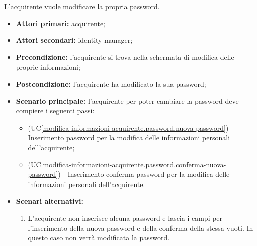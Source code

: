 \label{modifica-informazioni-acquirente.password}

L'acquirente vuole modificare la propria password.
\begin{itemize}
    \item \textbf{Attori primari:} acquirente;
    \item \textbf{Attori secondari:} identity manager;
    \item \textbf{Precondizione:} l'acquirente si trova nella schermata di modifica delle proprie informazioni;
    \item \textbf{Postcondizione:} l'acquirente ha modificato la sua password;
    \item \textbf{Scenario principale:} l'acquirente per poter cambiare la password deve compiere i seguenti passi:
    \begin{itemize}
        \item (UC\ref{modifica-informazioni-acquirente.password.nuova-password}) - Inserimento password per la modifica delle informazioni personali dell'acquirente;
        \item (UC\ref{modifica-informazioni-acquirente.password.conferma-nuova-password}) - Inserimento conferma password per la modifica delle informazioni personali dell'acquirente.
    \end{itemize}
    \item \textbf{Scenari alternativi:}
    \begin{enumerate}[label=\lett]
    	\item L'acquirente non inserisce alcuna password e lascia i campi per l'inserimento della nuova password e della conferma della stessa vuoti. In questo caso non verrà modificata la password.
    \end{enumerate}
\end{itemize}

\label{modifica-informazioni-acquirente.password.nuova-password}

